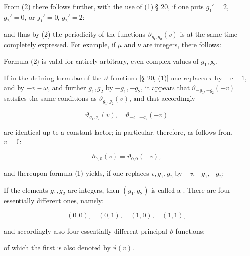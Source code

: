 
From (2) there follows further, with the use of (1) § 20, if one
puts $g_1' = 2$, $g_2' = 0$, or $g_1' = 0$, $g_2' = 2$:


and thus by (2) the periodicity of the functions
$\vartheta_{g_1,g_2}(v)$ is at the same time completely expressed. For example, if
$\mu$ and $\nu$ are integers, there follows:



Formula (2) is valid for entirely arbitrary, even complex
values of $g_1, g_2$.

If in the defining formulae of the $\vartheta$-functions
[§ 20, (1)] one replaces $v$ by $-v-1$, and by $-v-\omega$, and further $g_1, g_2$ by
$-g_1, -g_2$, it appears that $\vartheta_{-g_1,-g_2}(-v)$ satisfies the same
 conditions as $\vartheta_{g_1,g_2}(v)$, and that accordingly

\[
\vartheta_{g_1,g_2}(v),\quad \vartheta_{-g_1,-g_2}(-v)
\]

are identical up to a constant factor; in particular, therefore, as follows from $v = 0$:

\[
\vartheta_{0,0}(v) = \vartheta_{0,0}(-v),
\]

and thereupon formula (1) yields, if one replaces $v, g_1, g_2$ by
$-v, -g_1, -g_2$:


If the elements $g_1, g_2$ are integers, then $(g_1, g_2)$ is called
a . There are four essentially
different ones, namely:

\[
(0,0),\quad (0,1),\quad (1,0),\quad (1,1),
\]

and accordingly also four essentially different principal $\vartheta$-functions:


of which the first is also denoted by $\vartheta(v)$.

